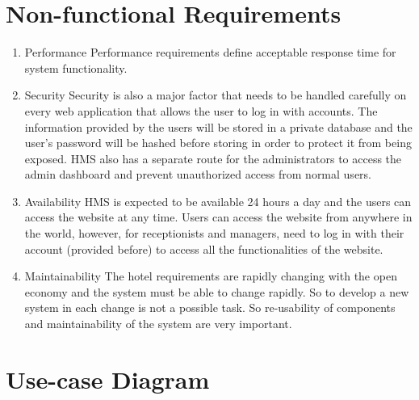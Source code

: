     \section{Non-functional Requirements}
    \begin{enumerate}
        \item Performance
\newline Performance requirements define acceptable response time for system functionality.
        \item Security
        \newline Security is also a major factor that needs to be handled carefully on every web application that allows
the user to log in with accounts. The information provided by the users will be stored in a private database and the user’s password will be hashed before storing in order to protect it from being exposed. HMS also has a separate route for the administrators to access the admin dashboard and prevent unauthorized access from normal users. 
        \item Availability
\newline     HMS is expected to be available 24 hours a day and the users can access the website at any time. Users can access the website from anywhere in the world, however, for receptionists and managers, need to log in with their account (provided before) to access all the functionalities of the website.
        \item Maintainability
\newline        The hotel requirements are rapidly changing with the open economy and the system must be able to change rapidly. So to develop a new system in each change is not a possible task. So re-usability of components and maintainability of the system are very important.
    \end{enumerate}
    
    \section{Use-case Diagram}
